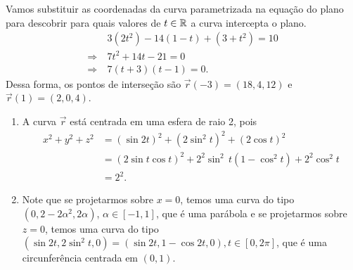 \begin{questions}
\setcounter{question}{5}
\begin{solution}
    Vamos substituir as coordenadas da curva parametrizada na equação do plano para descobrir para quais valores de $t\in{\mathbb R}$ a curva intercepta o plano.
    \begin{align*}
        & 3(2t^2)-14(1 - t)+(3 + t^2) = 10 \\
        \Rightarrow~ & 7 t^2 + 14 t - 21 = 0 \\
        \Rightarrow~ & 7 (t+3)(t-1) = 0.
    \end{align*}
    Dessa forma, os pontos de interseção são $\vec r(-3) = (18,4,12)$ e $\vec r(1) = (2,0,4)$.
\end{solution}



\begin{solution}
  \begin{enumerate}[label=(\alph*)]
    \item A curva $\vec r$ está centrada em uma esfera de raio 2, pois
    \begin{align*}
        x^2+y^2+z^2 &= (\sin 2t)^2 + (2\sin^2 t)^2 + (2\cos t)^2 \\
            &= (2\sin t \cos t)^2 + 2^2\sin^2\,t(1-\cos^2 t) + 2^2\cos ^2 t \\
            &= 2^2.
    \end{align*}
    
    \item Note que se projetarmos sobre $x = 0$, temos uma curva do tipo ${(0,2-2\alpha^2,2\alpha)}$, ${\alpha\in[-1,1]}$, que é uma parábola e se projetarmos sobre $z = 0$, temos uma curva do tipo $(\sin 2t, 2\sin^2 t,0) = (\sin 2t, 1-\cos 2t,0), t\in[0,2\pi]$, que é uma circunferência centrada em $(0,1)$.
    

\end{enumerate}
\end{solution}
\end{questions}
